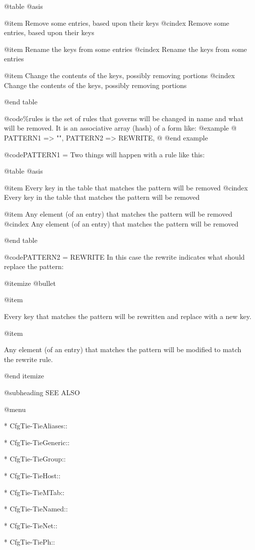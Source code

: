 @table @asis

@item Remove some entries, based upon their keys
@cindex Remove some entries, based upon their keys

@item Rename the keys from some entries
@cindex Rename the keys from some entries

@item Change the contents of the keys, possibly removing portions
@cindex Change the contents of the keys, possibly removing portions

@end table

@code{\%rules} is the set of rules that governs will be changed in name and what
will be removed.  It is an associative array (hash) of a form like:
@example
        @{
            PATTERN1 => "",
            PATTERN2 => REWRITE,
        @}
@end example

@code{PATTERN1 = }
Two things will happen with a rule like this:

@table @asis

@item Every key in the table that matches the pattern will be removed
@cindex Every key in the table that matches the pattern will be removed

@item Any element (of an entry) that matches the pattern will be removed
@cindex Any element (of an entry) that matches the pattern will be removed

@end table

@code{PATTERN2 = REWRITE}
In this case the rewrite indicates what should replace the pattern:

@itemize @bullet

@item

Every key that matches the pattern will be rewritten and replace with a
new key.

@item

Any element (of an entry) that matches the pattern will be modified to
match the rewrite rule.

@end itemize

@subheading SEE ALSO


@menu

* CfgTie-TieAliases::	
   
* CfgTie-TieGeneric::	
 
* CfgTie-TieGroup::	


* CfgTie-TieHost::	
      
* CfgTie-TieMTab::	
    
* CfgTie-TieNamed::	


* CfgTie-TieNet::	
       
* CfgTie-TiePh::	
      
